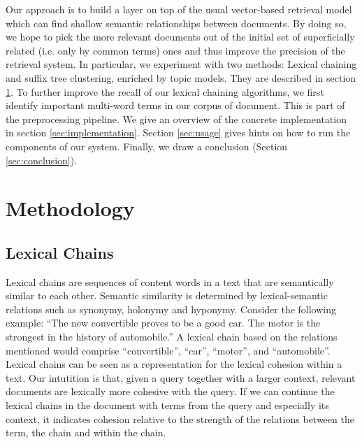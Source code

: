 \documentclass[11pt, a4paper, abstraction]{scrartcl}
\begin{document}
Our approach is to build a layer on top of the usual vector-based retrieval model which can find shallow semantic relationships between documents. By doing so, we hope to pick the more relevant documents out of the initial set of superficially related (i.e. only by common terms) ones and thus improve the precision of the retrieval system. In particular, we experiment with two methods: Lexical chaining and suffix tree clustering, enriched by topic models. They are described in section \ref{sec:methodology}. To further improve the recall of our lexical chaining algorithms, we first identify important multi-word terms in our corpus of document. This is part of the preprocessing pipeline. We give an overview of the concrete implementation in section \ref{sec:implementation}. Section \ref{sec:usage} gives hints on how to run the components of our system. Finally, we draw a conclusion (Section \ref{sec:conclusion}).    

\section{Methodology}
\label{sec:methodology}

\subsection{Lexical Chains}

Lexical chains are sequences of content words in a text that are semantically similar to each other. Semantic similarity is determined by lexical-semantic relations such as synonymy, holonymy and hyponymy. Consider the following example: ``The new convertible proves to be a good car. The motor is the strongest in the history of automobile.''
A lexical chain based on the relations mentioned would comprise ``convertible'', ``car'', ``motor'', and ``automobile''. Lexical chains can be seen as a representation for the lexical cohesion within a text. Our intutition is that, given a query together with a larger context, relevant documents are lexically more cohesive with the query. If we can continue the lexical chains in the document with terms from the query and especially its context, it indicates cohesion relative to the strength of the relations between the term, the chain and within the chain.
  
\end{document}
